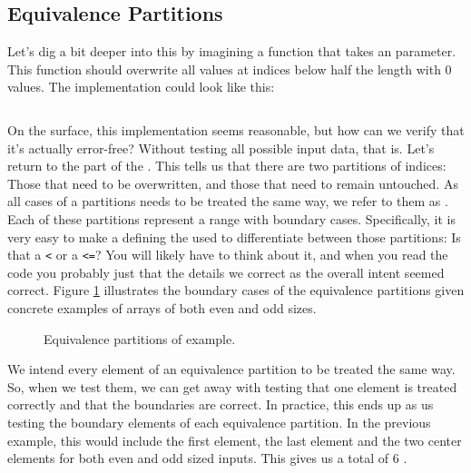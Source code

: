 \subsection{Equivalence Partitions}

Let's dig a bit deeper into this by imagining a function that takes an  parameter. This function should overwrite all values ​​at indices below half the length with 0 values. The implementation could look like this:

\inputminted[lastline=5]{csharp}{../src/csharp/test/zero_first_half/Program.cs}

On the surface, this implementation seems reasonable, but how can we verify that it’s actually error-free? Without testing all possible input data, that is. Let's return to the  part of the . This tells us that there are two partitions of indices: Those that need to be overwritten, and those that need to remain untouched. As all cases of a partitions needs to be treated the same way, we refer to them as . Each of these partitions represent a range with boundary cases. Specifically, it is very easy to make a  defining the  used to differentiate between those partitions: Is that a \texttt{<} or a \texttt{<=}? You will likely have to think about it, and when you read the code you probably just  that the details we correct as the overall intent seemed correct. Figure \ref{fig:test:eqpar} illustrates the boundary cases of the equivalence partitions given concrete examples of arrays of both even and odd sizes.

\begin{figure}[tbp]
  
  \caption{Equivalence partitions of  example.}
  \label{fig:test:eqpar}
\end{figure}

We intend every element of an equivalence partition to be treated the same way. So, when we test them, we can get away with testing that one element is treated correctly and that the boundaries are correct. In practice, this ends up as us testing the boundary elements of each equivalence partition. In the previous example, this would include the first element, the last element and the two center elements for both even and odd sized inputs. This gives us a total of 6 .

